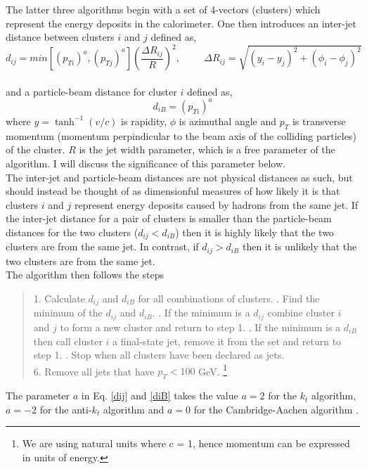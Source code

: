 \documentclass[a4paper,11pt, onecolumn]{article}
\begin{document}
 The latter three algorithms begin with a set of 4-vectors (clusters) which represent the energy deposits in the calorimeter. One then introduces an inter-jet distance between
 clusters $i$ and $j$ defined as,
 \begin{equation}
   d_{ij} = min[(p_{ Ti})^a, (p_{ Tj})^a]  \left(\frac{\Delta  R_{ij}}{R}\right) ^2, \hspace{1cm} \Delta R_{ij} = \sqrt{(y_{i} - y_{j})^2 + (\phi_{i} - \phi_{j})^2} \label{dij}
 \end{equation}\\

 \noindent and a particle-beam distance for cluster $i$ defined as,
 \begin{equation}
   d_{iB} = (p_{Ti})^a \label{diB}
 \end{equation}
 where $y = \tanh ^{-1}(v/c)$ is rapidity, $\phi$ is azimuthal angle and $p_T$ is transverse momentum (momentum perpindicular to the beam axis of the 
 colliding particles) of the cluster. $R$ is the jet width parameter, which is a free parameter of the algorithm. I will discuss the significance of this
 parameter below. \\

 The inter-jet and particle-beam distances are not physical distances as such, but should instead be thought of as dimensionful measures of how likely it is that
 clusters $i$ and $j$ represent energy deposits caused by hadrons from the same jet. If the inter-jet distance for a pair of clusters is smaller than the particle-beam distances
 for the two clusters ($d_{ij} < d_{iB}$) 
 then it is highly likely that the two clusters are from the same jet. 
 In contrast, if $d_{ij} > d_{iB}$ then it is unlikely that the two clusters are from the same jet.\\
 
 \noindent The algorithm then follows the steps
   \begin{quote}
   1. Calculate $d_{ij}$ and $d_{iB}$ for all combinations of clusters. . Find the minimum of the $d_{ij}$ and $d_{iB}$. . If the minimum is a $d_{ij}$ combine cluster $i$ and $j$ to form a new cluster and return to step 1. . If the minimum is a $d_{iB}$ then call cluster $i$ a final-state jet, remove it from the set and return to step 1.  . Stop when all clusters have been declared as jets. \\
   6. Remove all jets that have $p_T < 100$ GeV. \footnote{We are using natural units where c = 1, hence momentum can be expressed in units of energy.}
 
   \end{quote} 
 The parameter $a$ in Eq. \eqref{dij} and \eqref{diB} takes the value $a = 2$ for the $k_t$ algorithm, $a = -2$ for the anti-$k_t$ algorithm 
 and  $a = 0$ for the Cambridge-Aachen algorithm \cite{salam}. \newline
\end{document}
